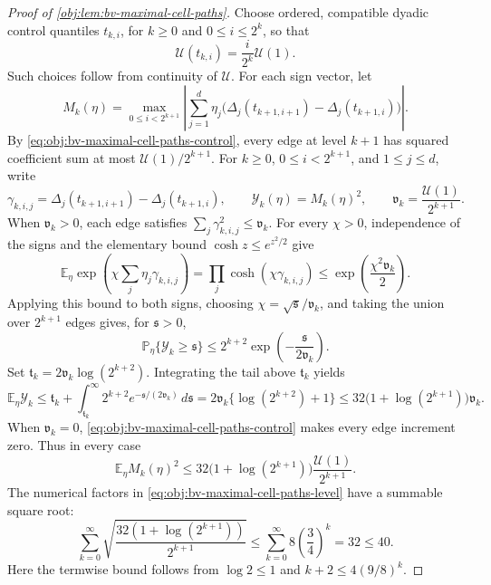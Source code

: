 \begin{proof}[Proof of \cref{obj:lem:bv-maximal-cell-paths}]
Choose ordered, compatible dyadic control quantiles \(t_{k,i}\), for
\(k\ge0\) and \(0\le i\le2^k\), so that
\[
\mathcal U(t_{k,i})=\frac{i}{2^k}\mathcal U(1).
\]
Such choices follow from continuity of \(\mathcal U\). For each sign
vector, let
\[
M_k(\eta)=
\max_{0\le i<2^{k+1}}
\left|
\sum_{j=1}^d\eta_j
 \bigl(\Delta_j(t_{k+1,i+1})-\Delta_j(t_{k+1,i})\bigr)
\right|.
\]
By \cref{eq:obj:bv-maximal-cell-paths-control}, every edge at level \(k+1\) has squared coefficient sum at most
\(\mathcal U(1)/2^{k+1}\). For \(k\ge0\), \(0\le i<2^{k+1}\), and \(1\le j\le d\), write
\[
\gamma_{k,i,j}
=\Delta_j(t_{k+1,i+1})-\Delta_j(t_{k+1,i}),
\qquad
\mathcal Y_k(\eta)=M_k(\eta)^2,
\qquad
\mathfrak v_k=\frac{\mathcal U(1)}{2^{k+1}}.
\]
When \(\mathfrak v_k>0\), each edge satisfies
\(\sum_j\gamma_{k,i,j}^2\le\mathfrak v_k\). For every
\(\chi>0\), independence of the signs and the elementary bound
\(\cosh z\le e^{z^2/2}\) give
\[
\mathbb E_\eta\exp\!\left(\chi\sum_j\eta_j\gamma_{k,i,j}\right)
=\prod_j\cosh(\chi\gamma_{k,i,j})
\le\exp\!\left(\frac{\chi^2\mathfrak v_k}{2}\right).
\]
Applying this bound to both signs, choosing
\(\chi=\sqrt{\mathfrak s}/\mathfrak v_k\), and taking the union over
\(2^{k+1}\) edges gives, for \(\mathfrak s>0\),
\[
\mathbb P_\eta\{\mathcal Y_k\ge\mathfrak s\}
\le 2^{k+2}\exp\!\left(-\frac{\mathfrak s}{2\mathfrak v_k}\right).
\]
Set \(\mathfrak t_k=2\mathfrak v_k\log(2^{k+2})\). Integrating the
tail above \(\mathfrak t_k\) yields
\[
\mathbb E_\eta\mathcal Y_k
\le\mathfrak t_k+
 \int_{\mathfrak t_k}^\infty
 2^{k+2}e^{-\mathfrak s/(2\mathfrak v_k)}\,d\mathfrak s
=2\mathfrak v_k\{\log(2^{k+2})+1\}
\le32\bigl(1+\log(2^{k+1})\bigr)\mathfrak v_k.
\]
When \(\mathfrak v_k=0\), \cref{eq:obj:bv-maximal-cell-paths-control}
makes every edge increment zero. Thus in every case
\begin{equation}
\mathbb E_\eta M_k(\eta)^2
\le
32\bigl(1+\log(2^{k+1})\bigr)
   \frac{\mathcal U(1)}{2^{k+1}}.
\label{eq:obj:bv-maximal-cell-paths-level}
\end{equation}
The numerical factors in \cref{eq:obj:bv-maximal-cell-paths-level}
have a summable square root:
\begin{equation}
\sum_{k=0}^\infty
 \sqrt{\frac{32(1+\log(2^{k+1}))}{2^{k+1}}}
\le
\sum_{k=0}^\infty 8\left(\frac34\right)^k
=32\le40.
\label{eq:obj:bv-maximal-cell-paths-series}
\end{equation}
Here the termwise bound follows from \(\log 2\le1\) and
\(k+2\le4(9/8)^k\).


\end{proof}
